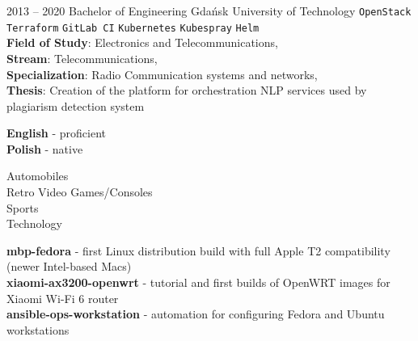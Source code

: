 \documentclass[9pt]{style/developercv}
\begin{document}

\begin{entrylist}
	\entry
		{2013 -- 2020}
    {Bachelor of Engineering}
    {Gdańsk University of Technology}
    {
      \texttt{OpenStack}\slashsep
      \texttt{Terraform}\slashsep
      \texttt{GitLab CI}\slashsep
			\texttt{Kubernetes}\slashsep
			\texttt{Kubespray}\slashsep
			\texttt{Helm}\\

      \textbf{Field of Study}: Electronics and Telecommunications, \\
      \textbf{Stream}: Telecommunications,\\
      \textbf{Specialization}: Radio Communication systems and networks,\\
      \textbf{Thesis}: Creation of the platform for orchestration NLP services used by plagiarism detection system\\
    }
		{}
\end{entrylist}


\begin{minipage}[t]{0.3\textwidth}
	\vspace{-\baselineskip}


	\textbf{English} - proficient\\
	\textbf{Polish} - native
\end{minipage}
\hfill
\begin{minipage}[t]{0.3\textwidth}
	\vspace{-\baselineskip}


  Automobiles\\
  Retro Video Games/Consoles\\
  Sports\\
  Technology
\end{minipage}
\hfill
\begin{minipage}[t]{0.3\textwidth}
	\vspace{-\baselineskip}


  \textbf{mbp-fedora} - first Linux distribution build with full Apple T2 compatibility (newer Intel-based Macs)\\
  \textbf{xiaomi-ax3200-openwrt} - tutorial and first builds of OpenWRT images for Xiaomi Wi-Fi 6 router\\
  \textbf{ansible-ops-workstation} - automation for configuring Fedora and Ubuntu workstations

\end{minipage}
\end{document}
